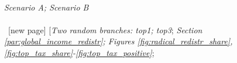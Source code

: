 \begin{enumerate}[resume]
  \\ \textit{Scenario A; Scenario B} \\\\
  ~[new page] [\textit{Two random branches: top1; top3}; \textit{Section \ref{par:global_income_redistr}; Figures \ref{fig:radical_redistr_share}, \ref{fig:top_tax_share}-\ref{fig:top_tax_positive}}; 

\end{enumerate}
